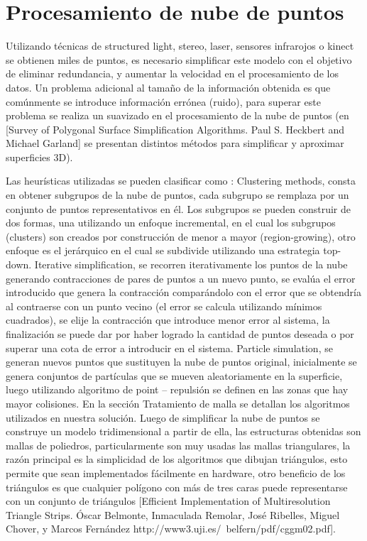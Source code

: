 \section{Procesamiento de nube de puntos}

Utilizando técnicas de structured light, stereo, laser, sensores infrarojos o kinect se obtienen miles de puntos, es necesario simplificar este modelo con el objetivo de eliminar redundancia, y aumentar la velocidad en el procesamiento de los datos. Un problema adicional al tamaño de la información obtenida es que comúnmente se introduce información errónea (ruido), para superar este problema se realiza un suavizado en el procesamiento de la nube de puntos (en [Survey of Polygonal Surface Simplification Algorithms.  Paul S. Heckbert and Michael Garland] se presentan distintos métodos para simplificar y aproximar superficies 3D).

Las heurísticas utilizadas se pueden clasificar como\cite{PntCloud} :
   Clustering methods, consta en obtener subgrupos de la nube de puntos, cada subgrupo se remplaza por un conjunto de puntos representativos en él. Los subgrupos se pueden construir de dos formas, una utilizando un enfoque incremental, en el cual los subgrupos (clusters) son creados por construcción de menor a mayor (region-growing), otro enfoque es el jerárquico en el cual se subdivide utilizando una estrategia top-down.
   Iterative simplification, se recorren iterativamente los puntos de la nube generando contracciones de pares de puntos a un nuevo punto, se evalúa el error introducido que genera la contracción comparándolo con el error que se obtendría al contraerse con un punto vecino (el error se calcula utilizando mínimos cuadrados), se elije la contracción que introduce menor error al sistema, la finalización se puede dar por haber logrado la cantidad de puntos deseada o por superar una cota de error a introducir en el sistema.
   Particle simulation, se generan nuevos puntos que sustituyen la nube de puntos original, inicialmente se genera conjuntos de partículas que se mueven aleatoriamente en la superficie, luego utilizando algoritmo de point – repulsión se definen en las zonas que hay mayor colisiones.
En la sección Tratamiento de malla se detallan los algoritmos utilizados en nuestra solución.
Luego de simplificar la nube de puntos se construye un modelo tridimensional a partir de ella, las estructuras obtenidas son mallas de poliedros, particularmente son muy usadas las mallas triangulares, la razón principal es la simplicidad de los algoritmos que dibujan triángulos, esto permite que sean implementados fácilmente en hardware, otro beneficio de los triángulos es que cualquier polígono con más de tres caras puede representarse con un conjunto de triángulos [Efficient Implementation of Multiresolution Triangle Strips. Óscar Belmonte, Inmaculada Remolar, José Ribelles, Miguel Chover, y Marcos Fernández   http://www3.uji.es/~belfern/pdf/cggm02.pdf].

